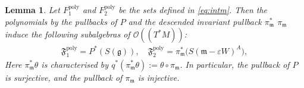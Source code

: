 \documentclass[11pt]{amsart}
\newtheorem{lemma}[theorem]{Lemma}
\theoremstyle{definition}
\theoremstyle{plain}
\theoremstyle{conclusion}
\begin{document}
\begin{lemma}
\label{lem:poly}
  Let $F_1^{\mathrm{poly}}$ and $F_2^{\mathrm{poly}}$ be the sets defined in \eqref{eq:intm}. Then the polynomials by the pullbacks of $P$ and the descended invariant pullback $\pi_\mathfrak{m}^*$ $\pi_\mathfrak{m}$ induce the following subalgebras of $\mathcal{O}( (T^*M)) $: \begin{align*}
      \mathfrak{F}_1^{\mathrm{poly}}=P^*(S(\mathfrak{g})),\quad \mathfrak{F}_2^{\mathrm{poly}}=\pi_{\mathfrak{m}}^*\bigl(S(\mathfrak{m}-\varepsilon W)^A\bigr) ,
  \end{align*}  Here $\pi_{\mathfrak{m}}^*\theta$ is characterised by $q^*(\pi_{\mathfrak{m}}^*\theta) := \theta \circ \pi_{\mathfrak{m}} $. In particular, the pullback of $P$ is surjective, and the pullback of $\pi_\mathfrak{m}$ is injective.
\end{lemma}
\end{document}
